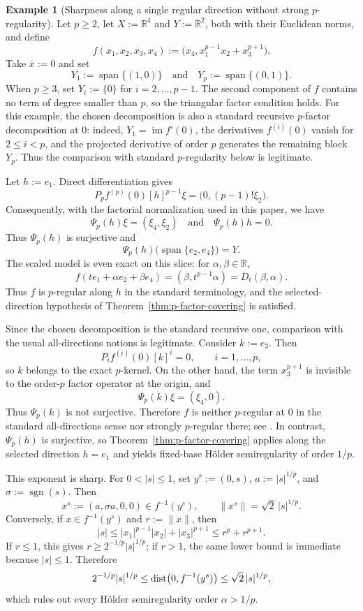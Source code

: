 \documentclass[11pt]{amsart}
\theoremstyle{definition}
\newtheorem{example}[theorem]{Example}
\theoremstyle{remark}
\newcommand{\bx}{\bar x}
\newcommand{\R}{\mathbb R}
\newcommand{\dist}{\mathop{\rm dist}\nolimits}
\begin{document}
	\begin{example}[Sharpness along a single regular direction without strong
		$p$-regularity]
		\label{ex:directional-not-strong}
		Let $p\ge2$, let $X:=\R^4$ and $Y:=\R^2$, both with their Euclidean
		norms, and define
		$$
		f(x_1,x_2,x_3,x_4)
		:=
		\bigl(x_4,x_1^{p-1}x_2+x_3^{p+1}\bigr).
		$$
		Take $\bx:=0$ and set
		$$
		Y_1:=\operatorname{span}\{(1,0)\}\quad\text{and}
		\quad
		Y_p:=\operatorname{span}\{(0,1)\}.
		$$
		When $p\ge3$, set $Y_i:=\{0\}$ for $i=2,\ldots,p-1$.
		The second component of $f$ contains no term of degree smaller than
		$p$, so the triangular factor condition holds.
		For this example, the chosen decomposition is also a standard recursive
		$p$-factor decomposition at $0$: indeed,
		$Y_1=\operatorname{im}f'(0)$, the derivatives $f^{(i)}(0)$ vanish for
		$2\le i<p$, and the projected derivative of order $p$ generates the
		remaining block $Y_p$.  Thus the comparison with standard $p$-regularity
		below is legitimate.
		
		Let $h:=e_1$. Direct differentiation gives
		$$
		P_pf^{(p)}(0)[h]^{p-1}\xi
		=
		\bigl(0,(p-1)!\xi_2\bigr).
		$$
		Consequently, with the factorial normalization used in this paper, we have
		$$
		\Psi_p(h)\xi=(\xi_4,\xi_2)
		\quad \text{and}\quad
		\Psi_p(h)h=0.
		$$
		Thus $\Psi_p(h)$ is surjective and
		$$
		\Psi_p(h)\bigl(\operatorname{span}\{e_2,e_4\}\bigr)=Y.
		$$
		The scaled model is even exact on this slice: for
		$\alpha,\beta\in\R$,
		$$
		f(te_1+\alpha e_2+\beta e_4)
		=
		(\beta,t^{p-1}\alpha)
		=D_t(\beta,\alpha).
		$$
		Thus $f$ is $p$-regular along $h$ in the standard terminology, and the
		selected-direction hypothesis of
		Theorem~\ref{thm:p-factor-covering} is satisfied.
		
		Since the chosen decomposition is the standard recursive one, comparison
		with the usual all-directions notions is legitimate. Consider $k:=e_3$.
		Then
		$$
		P_i f^{(i)}(0)[k]^i=0,
		\qquad i=1,\ldots,p,
		$$
		so $k$ belongs to the exact $p$-kernel. On the other hand, the term
		$x_3^{p+1}$ is invisible to the order-$p$ factor operator at the origin,
		and
		$$
		\Psi_p(k)\xi=(\xi_4,0).
		$$
		Thus $\Psi_p(k)$ is not surjective. Therefore $f$ is neither
		$p$-regular at $0$ in the standard all-directions sense nor strongly
		$p$-regular there; see \cite[Definitions~6 and~7]{BednarczukEtAlSurvey}.
		In contrast, $\Psi_p(h)$ is surjective, so
		Theorem~\ref{thm:p-factor-covering} applies along the selected direction
		$h=e_1$ and yields fixed-base H\"older semiregularity of order $1/p$.
		
		This exponent is sharp. For $0<|s|\le1$, set $y^s:=(0,s)$,
		$a:=|s|^{1/p}$, and $\sigma:=\operatorname{sgn}(s)$. Then
		$$
		x^s:=(a,\sigma a,0,0)\in f^{-1}(y^s),
		\qquad
		\|x^s\|=\sqrt2\,|s|^{1/p}.
		$$
		Conversely, if $x\in f^{-1}(y^s)$ and $r:=\|x\|$, then
		$$
		|s|
		\le |x_1|^{p-1}|x_2|+|x_3|^{p+1}
		\le r^p+r^{p+1}.
		$$
		If $r\le1$, this gives $r\ge2^{-1/p}|s|^{1/p}$; if $r>1$, the same
		lower bound is immediate because $|s|\le1$. Therefore
		$$
		2^{-1/p}|s|^{1/p}
		\le \dist\bigl(0,f^{-1}(y^s)\bigr)
		\le \sqrt2\,|s|^{1/p},
		$$
		which rules out every H\"older semiregularity order $\alpha>1/p$.
	\end{example}
	
\end{document}
